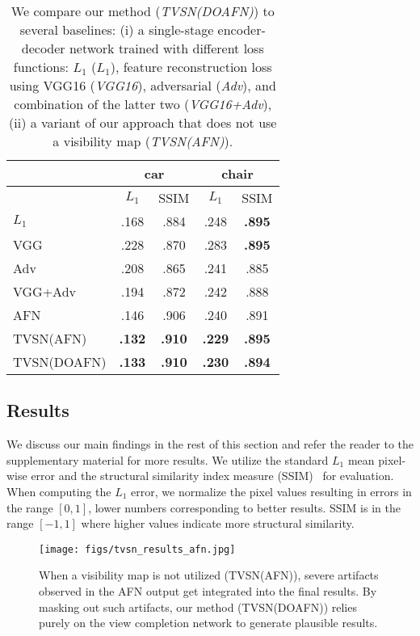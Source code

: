 \documentclass[10pt,twocolumn,letterpaper]{article}
\begin{document}
\begin{table}[]
\centering
\caption{We compare our method (\emph{TVSN(DOAFN)}) to several baselines: (i) a single-stage encoder-decoder network trained with different loss functions: $L_1$ (\emph{$L_1$}), feature reconstruction loss using VGG16 (\emph{VGG16}), adversarial (\emph{Adv}), and combination of the latter two (\emph{VGG16+Adv}), (ii) a variant of our approach that does not use a visibility map (\emph{TVSN(AFN)}).}
\label{tabel:quant}
\begin{tabular}{l|cc|cc}
                  & \multicolumn{2}{c}{car} & \multicolumn{2}{|c}{chair} \\ \hline
                  & $L_1$     & SSIM   & $L_1$      & SSIM   \\ \hline
$L_1$\cite{tatarchenko_eccv2016}                & .168  & .884  & .248   & \textbf{.895} \\
VGG               & .228  & .870  & .283   & \textbf{.895} \\
Adv               & .208  & .865  & .241   & .885 \\
VGG+Adv           & .194  & .872  & .242   & .888 \\
AFN\cite{Zhou_eccv2016}               & .146  & .906  & .240   & .891 \\
TVSN(AFN)         & \textbf{.132} & \textbf{.910} & \textbf{.229} & \textbf{.895}  \\
TVSN(DOAFN)       & \textbf{.133} & \textbf{.910} & \textbf{.230} & \textbf{.894}  \\
\end{tabular}
\vspace{-2mm}
\vspace{-2mm}
\end{table}


\subsection{Results}
We discuss our main findings in the rest of this section and refer the reader to the supplementary material for more results.
We utilize the standard $L_1$ mean pixel-wise error and the structural similarity index measure (SSIM)~\cite{Wang04imagequality,mathieu_iclr2016} for evaluation. When computing the $L_1$ error, we normalize the pixel values resulting in errors in the range $[0,1]$, lower numbers corresponding to better results. SSIM is in the range $[-1,1]$ where higher values indicate more structural similarity.

\label{sec:tvsn_results_afn}
\vspace{-2mm}
\begin{figure}[thbp]
\begin{center}
\texttt{[image: figs/tvsn\_results\_afn.jpg]}
\end{center}
\caption{When a visibility map is not utilized (TVSN(AFN)), severe artifacts observed in the AFN output get integrated into the final results. By masking out such artifacts, our method (TVSN(DOAFN)) relies purely on the view completion network to generate plausible results.}
\label{fig:tvsn_results_afn}
\vspace{-3mm}
\end{figure}
\end{document}
